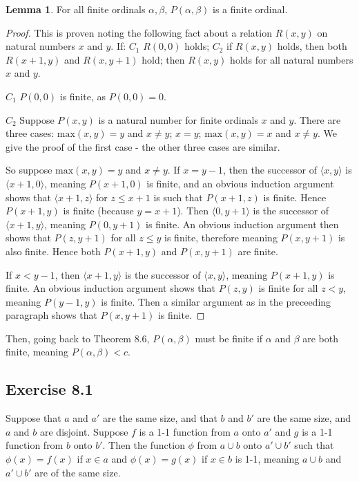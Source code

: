 \documentclass{article}
\theoremstyle{definition}
\newtheorem{lemma}[theorem]{Lemma}
\begin{document}
\begin{lemma}
For all finite ordinals $\alpha,\beta$, $P(\alpha,\beta)$ is a finite ordinal.
\end{lemma}
\begin{proof}
This is proven noting the following fact about a relation $R(x,y)$ on natural 
numbers $x$ and $y$. If:\newline
$C_1$ $R(0,0)$ holds;\newline
$C_2$ if $R(x,y)$ holds, then both $R(x+1,y)$ and $R(x,y+1)$ hold;\newline
then $R(x,y)$ holds for all natural numbers $x$ and $y$.

$C_1$ $P(0,0)$ is finite, as $P(0,0)=0$.

$C_2$ Suppose $P(x,y)$ is a natural number for finite ordinals $x$ and $y$. 
There are three cases: $\textrm{max}(x,y)=y$ and $x\ne y$; $x=y$;
$\textrm{max}(x,y)=x$ and $x\ne y$. We give the proof of the first case - the other three 
cases are similar.

So suppose $\textrm{max}(x,y)=y$ and $x\ne y$. If $x=y-1$, then 
the successor of $\langle x,y\rangle$ is $\langle x+1,0\rangle$, meaning 
$P(x+1,0)$ is finite, and an obvious induction argument 
shows that $\langle x+1,z\rangle $ for $z\le x+1$ is such that 
$P(x+1,z)$ is finite. Hence $P(x+1,y)$ is finite (because $y=x+1$). 
Then $\langle 0,y+1\rangle$ is the successor of $\langle x+1,y\rangle$, meaning 
$P(0,y+1)$ is finite. An obvious induction argument then shows that $P(z,y+1)$ for all 
$z\le y$ is finite, therefore meaning $P(x,y+1)$ is also finite. Hence both 
$P(x+1,y)$ and $P(x,y+1)$ are finite.

If $x<y-1$, then $\langle x+1,y\rangle$ is the successor of $\langle x,y\rangle$, meaning 
$P(x+1,y)$ is finite. An obvious induction argument shows that $P(z,y)$ is finite for all 
$z<y$, meaning $P(y-1,y)$ is finite. Then a similar argument as in the preceeding paragraph shows that 
$P(x,y+1)$ is finite.
\end{proof}

Then, going back to Theorem 8.6, $P(\alpha,\beta)$ must be finite if $\alpha$ and $\beta$ are both finite, meaning 
$P(\alpha,\beta)<c$.

\subsection*{Exercise 8.1}
Suppose that $a$ and $a'$ are the same size, and that $b$ and $b'$ are the same size, and $a$ and $b$ are disjoint. Suppose 
$f$ is a 1-1 function from $a$ onto $a'$ and $g$ is a 1-1 function from $b$ onto $b'$.
Then the function $\phi$ from $a\cup b$ onto $a'\cup b'$ such that $\phi(x)=f(x)$ if 
$x\in a$ and $\phi(x)=g(x)$ if $x\in b$ is 1-1, meaning $a\cup b$ and $a'\cup b'$ are of the same size.
\end{document}
